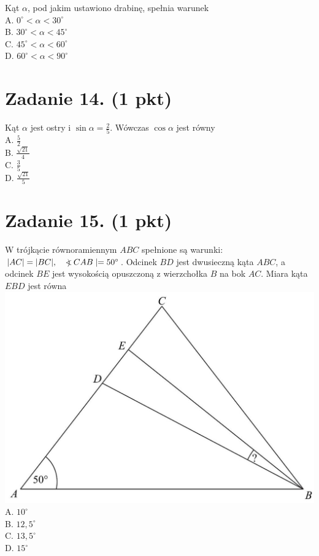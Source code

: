 \documentclass[10pt]{article}
\newcommand\Varangle{\mathop{{<\!\!\!\!\!\text{\small)}}\:}\nolimits}
\begin{document}
Kąt \(\alpha\), pod jakim ustawiono drabinę, spełnia warunek\\
A. \(0^{\circ}<\alpha<30^{\circ}\)\\
B. \(30^{\circ}<\alpha<45^{\circ}\)\\
C. \(45^{\circ}<\alpha<60^{\circ}\)\\
D. \(60^{\circ}<\alpha<90^{\circ}\)

\section*{Zadanie 14. (1 pkt)}
Kąt \(\alpha\) jest ostry i \(\sin \alpha=\frac{2}{5}\). Wówczas \(\cos \alpha\) jest równy\\
A. \(\frac{5}{2}\)\\
B. \(\frac{\sqrt{21}}{4}\)\\
C. \(\frac{3}{5}\)\\
D. \(\frac{\sqrt{21}}{5}\)

\section*{Zadanie 15. (1 pkt)}
W trójkącie równoramiennym \(A B C\) spełnione są warunki: \(|A C|=|B C|, \quad \Varangle C A B \mid=50^{\circ}\). Odcinek \(B D\) jest dwusieczną kąta \(A B C\), a odcinek \(B E\) jest wysokością opuszczoną z wierzchołka \(B\) na bok \(A C\). Miara kąta \(E B D\) jest równa\\
\includegraphics[max width=\textwidth, center]{2024_11_21_e19607c15353cb4d7e48g-06(1)}\\
A. \(10^{\circ}\)\\
B. \(12,5^{\circ}\)\\
C. \(13,5^{\circ}\)\\
D. \(15^{\circ}\)
\end{document}
